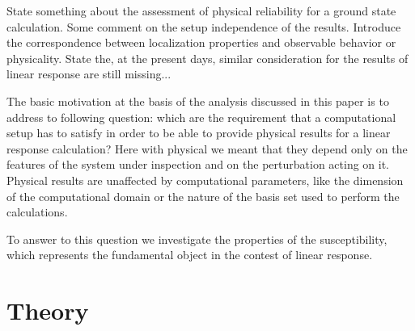 \documentclass[reprint,aps,prb]{revtex4-1}
\begin{document}








\vspace{1cm}

State something about the assessment of physical reliability for a ground state calculation. Some comment on the setup independence of the results. Introduce the correspondence
between localization properties and observable behavior or physicality. State the, at the present days, similar consideration for the results of linear response are still 
missing...

The basic motivation at the basis of the analysis discussed in this paper is to address to following question: which are the requirement that a computational setup has to
satisfy in order to be able to provide physical results for a linear response calculation? Here with physical we meant that they depend only on the features of the system under
inspection and on the perturbation acting on it. Physical results are unaffected by computational parameters, like the dimension of the computational domain or the nature of
the basis set used to perform the calculations. 

To answer to this question we investigate the properties of the susceptibility, which represents the fundamental object in the contest of linear response. 


\section{Theory}
\end{document}
